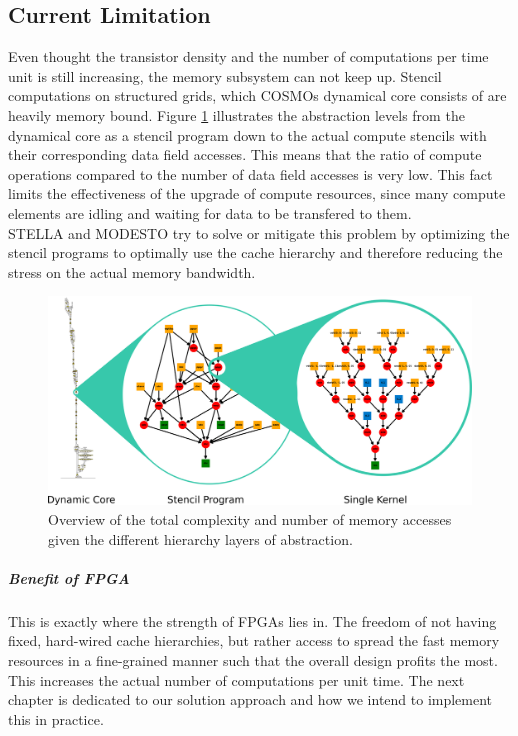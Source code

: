 \subsection{Current Limitation}
Even thought the transistor density and the number of computations per time unit is still increasing, the memory subsystem can not keep up. Stencil computations on structured grids, which COSMOs dynamical core consists of are heavily memory bound. Figure \ref{fig:dycore-estimate-complexity} illustrates the abstraction levels from the dynamical core as a stencil program down to the actual compute stencils with their corresponding data field accesses. This means that the ratio of compute operations compared to the number of data field accesses is very low. This fact limits the effectiveness of the upgrade of compute resources, since many compute elements are idling and waiting for data to be transfered to them. \\
STELLA \cite{label2} and MODESTO \cite{label3} try to solve or mitigate this problem by optimizing the stencil programs to optimally use the cache hierarchy and therefore reducing the stress on the actual memory bandwidth. 
\begin{figure}[H]
	\centering
	\includegraphics[width=.7\textwidth]{drawings/dycore-estimate-complexity.png}
	\caption{Overview of the total complexity and number of memory accesses given the different hierarchy layers of abstraction.}
	\label{fig:dycore-estimate-complexity}
\end{figure}


\subparagraph{Benefit of FPGA}
This is exactly where the strength of FPGAs lies in. The freedom of not having fixed, hard-wired cache hierarchies, but rather access to spread the fast memory resources in a fine-grained manner such that the overall design profits the most. This increases the actual number of computations per unit time. The next chapter is dedicated to our solution approach and how we intend to implement this in practice.